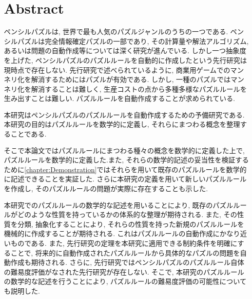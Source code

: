 \chapter*{{\rm \bf Abstract}}\label{chapter:Abstract}
ペンシルパズルは, 世界で最も人気のパズルジャンルのうちの一つである. ペンシルパズルは完全情報確定パズルの一部であり, その計算量や解法アルゴリズム, あるいは問題の自動作成等については深く研究が進んでいる. しかし一つ抽象度を上げた, ペンシルパズルのパズルルールを自動的に作成したという先行研究は現時点で存在しない. 先行研究で述べられているように, 商業用ゲームでのマンネリ化を解消するためにはパズルが有効である. しかし, 一種のパズルではマンネリ化を解消することは難しく, 生産コストの点から多種多様なパズルルールを生み出すことは難しい. パズルルールを自動作成することが求められている.

本研究はペンシルパズルのパズルルールを自動作成するための予備研究である. 本研究の目的はパズルルールを数学的に定義し, それらにまつわる概念を整理することである.

そこで本論文ではパズルルールにまつわる種々の概念を数学的に定義した上で, パズルルールを数学的に定義した.また, それらの数学的記述の妥当性を検証するために\cref{chapter:Demonstration}ではそれらを用いて既存のパズルルールを数学的に記述できることを実証した. さらに本研究の定義を用いて新しいパズルルールを作成し, そのパズルルールの問題が実際に存在することも示した.

本研究でのパズルルールの数学的な記述を用いることにより, 既存のパズルルールがどのような性質を持っているかの体系的な整理が期待される. また, その性質を分類, 抽象化することにより, それらの性質を持った新規のパズルルールを機械的に作成することが期待される. これはパズルルールの自動作成にかなり近いものである. また, 先行研究の定理を本研究に適用できる制約条件を明確にすることで, 将来的に自動作成されたパズルルールから具体的なパズルの問題を自動作成も期待される. さらに, 先行研究ではペンシルパズルのパズルルール自体の難易度評価がなされた先行研究が存在しない. そこで, 本研究のパズルルールの数学的な記述を行うことにより, パズルルールの難易度評価の可能性についても説明した.
